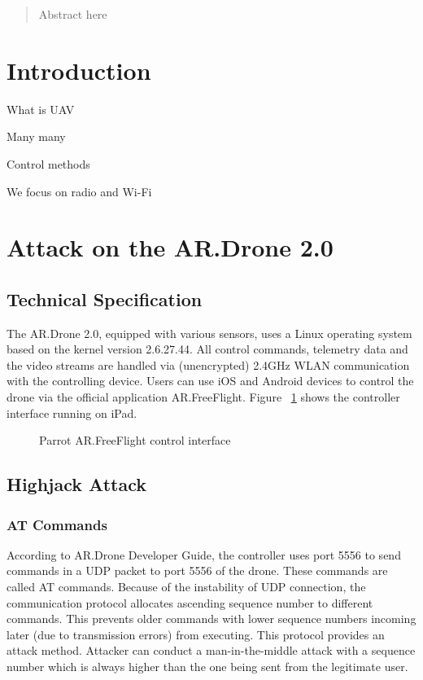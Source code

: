\documentclass{acm_proc_article-sp}
\begin{document}
\maketitle
\begin{abstract}
Abstract here
\end{abstract}





\section{Introduction}
What is UAV

Many many

Control methods

We focus on radio and Wi-Fi

\section{Attack on the AR.Drone 2.0}

\subsection{Technical Specification}
The AR.Drone 2.0, equipped with various sensors, uses a Linux operating system based on the kernel version 2.6.27.44. All control commands, telemetry data and the video streams are handled via (unencrypted) 2.4GHz WLAN communication with the controlling device. Users can use iOS and Android devices to control the drone via the official application AR.FreeFlight. Figure ~\ref{iPad} shows the controller interface running on iPad.

\begin{figure}
\centering
\label{iPad}
\caption{Parrot AR.FreeFlight control interface}
\end{figure}


\subsection{Highjack Attack}

\subsubsection{AT Commands}
According to AR.Drone Developer Guide\cite{dev:guide}, the controller uses port 5556 to send commands in a UDP packet to port 5556 of the drone. These commands are called AT commands. Because of the instability of UDP connection, the communication protocol allocates ascending sequence number to different commands. This prevents older commands with lower sequence numbers incoming later (due to transmission errors) from executing\cite{hack:secure}. This protocol provides an attack method. Attacker can conduct a man-in-the-middle attack with a sequence number which is always higher than the one being sent from the legitimate user.
\end{document}
